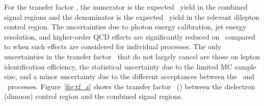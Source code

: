 For the transfer factor \RZll, the numerator is the expected \zinvg\ yield in the combined signal regions and the denominator is the expected \zllg\ yield in the relevant dilepton control region.
The uncertainties due to photon energy calibration, jet energy resolution, and higher-order QCD effects are significantly reduced on \RZll\ compared to when such effects are considered for individual processes. 
The only uncertainties in the transfer factor \RZll\ that do not largely cancel are those on lepton identification efficiency, the statistical uncertainty due to the limited MC sample size, and a minor uncertainty due to the different acceptances between the \zinvg\ and \zllg\ processes.
Figure~\ref{fig:tf_z} shows the transfer factor \RZee\ (\RZmm) between the dielectron (dimuon) control region and the combined signal regions.

